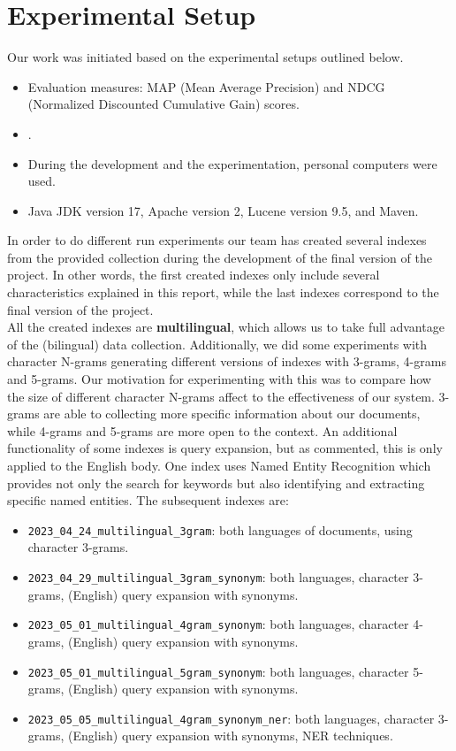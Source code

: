 \section{Experimental Setup}
\label{sec:setup}

Our work was initiated based on the experimental setups outlined below.
\begin{itemize}
	\item Evaluation measures: MAP (Mean Average Precision) and NDCG (Normalized Discounted Cumulative Gain) scores.
	\item \citep[Repository]{jihuming}.
	\item During the development and the experimentation, personal computers were used.
	\item Java JDK version 17, Apache version 2, Lucene version 9.5, and Maven.
\end{itemize}
In order to do different run experiments our team has created several indexes from the provided collection during the development of the final version of the project. In other words, the first created indexes only include several characteristics explained in this report, while the last indexes correspond to the final version of the project.\\
All the created indexes are \textbf{multilingual}, which allows us to take full advantage of the (bilingual) data collection. Additionally, we did some experiments with character N-grams generating different versions of indexes with 3-grams, 4-grams and 5-grams. Our motivation for experimenting with this was to compare how the size of different character N-grams affect to the effectiveness of our system. 3-grams are able to collecting more specific information about our documents, while 4-grams and 5-grams are more open to the context. An additional functionality of some indexes is query expansion, but as commented, this is only applied to the English body. One index uses Named Entity Recognition which provides not only the search for keywords but also identifying and extracting specific named entities.
The subsequent indexes are:
\begin{itemize}
	\item \texttt{2023\_04\_24\_multilingual\_3gram}: both languages of documents, using character 3-grams.
	\item \texttt{2023\_04\_29\_multilingual\_3gram\_synonym}: both languages, character 3-grams, (English) query expansion with synonyms.
	\item \texttt{2023\_05\_01\_multilingual\_4gram\_synonym}: both languages, character 4-grams, (English) query expansion with synonyms.
	\item \texttt{2023\_05\_01\_multilingual\_5gram\_synonym}: both languages, character 5-grams, (English) query expansion with synonyms.
	\item \texttt{2023\_05\_05\_multilingual\_4gram\_synonym\_ner}: both languages, character 3-grams, (English) query expansion with synonyms, NER techniques.
\end{itemize}


